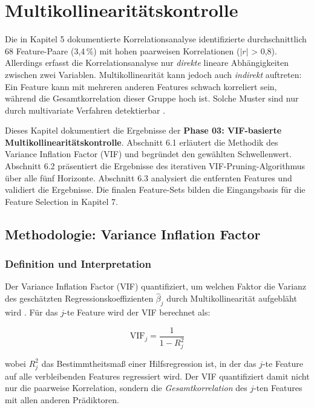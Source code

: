 \chapter{Multikollinearitätskontrolle}

Die in Kapitel 5 dokumentierte Korrelationsanalyse identifizierte durchschnittlich 68 Feature-Paare (3,4\,\%) mit hohen paarweisen Korrelationen ($|r|$ > 0,8). Allerdings erfasst die Korrelationsanalyse nur \textit{direkte} lineare Abhängigkeiten zwischen zwei Variablen. Multikollinearität kann jedoch auch \textit{indirekt} auftreten: Ein Feature kann mit mehreren anderen Features schwach korreliert sein, während die Gesamtkorrelation dieser Gruppe hoch ist. Solche Muster sind nur durch multivariate Verfahren detektierbar \parencite{obrien2007caution}.

Dieses Kapitel dokumentiert die Ergebnisse der \textbf{Phase 03: VIF-basierte Multikollinearitätskontrolle}. Abschnitt 6.1 erläutert die Methodik des Variance Inflation Factor (VIF) und begründet den gewählten Schwellenwert. Abschnitt 6.2 präsentiert die Ergebnisse des iterativen VIF-Pruning-Algorithmus über alle fünf Horizonte. Abschnitt 6.3 analysiert die entfernten Features und validiert die Ergebnisse. Die finalen Feature-Sets bilden die Eingangsbasis für die Feature Selection in Kapitel 7.

\section{Methodologie: Variance Inflation Factor}

\subsection{Definition und Interpretation}

Der Variance Inflation Factor (VIF) quantifiziert, um welchen Faktor die Varianz des geschätzten Regressionskoeffizienten $\hat{\beta}_j$ durch Multikollinearität aufgebläht wird \parencite{pennstate2024vif}. Für das $j$-te Feature wird der VIF berechnet als:

\begin{equation}
\text{VIF}_j = \frac{1}{1 - R_j^2}
\end{equation}

wobei $R_j^2$ das Bestimmtheitsmaß einer Hilfsregression ist, in der das $j$-te Feature auf alle verbleibenden Features regressiert wird. Der VIF quantifiziert damit nicht nur die paarweise Korrelation, sondern die \textit{Gesamtkorrelation} des $j$-ten Features mit allen anderen Prädiktoren.

